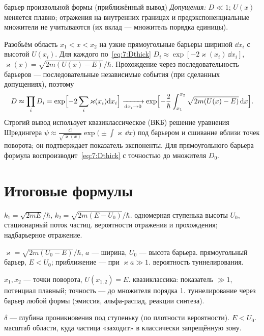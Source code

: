 \begin{derivation}[label=der:7:wkb]{барьер произвольной формы (приближённый вывод)}
\emph{Допущения:} $D\ll1$; $U(x)$ меняется плавно; отражения на внутренних границах и
предэкспоненциальные множители не учитываются (их вклад — множитель порядка единицы).

Разобьём область $x_1<x<x_2$ на узкие прямоугольные барьеры шириной $\dd x_i$ с высотой
$U(x_i)$. Для каждого по~\eqref{eq:7:Dthick} $D_i\approx\exp[-2\varkappa(x_i)\,\dd x_i]$,
$\varkappa(x)=\sqrt{2m(U(x)-E)}/\hbar$. Прохождение через последовательность барьеров — последовательные
независимые события (при сделанных допущениях), поэтому
\[
  D\approx\prod_iD_i=\exp\Bigl[-2\sum_i\varkappa(x_i)\mathrm{d} x_i\Bigr]\xrightarrow[\mathrm{d} x_i\to0]{}
  \exp\Bigl[-\frac2\hbar\int_{x_1}^{x_2}\sqrt{2m(U(x)-E)}\,\mathrm{d} x\Bigr].
\]
Строгий вывод использует квазиклассическое (ВКБ) решение уравнения Шредингера
$\psi\approx\frac{C}{\sqrt{\varkappa(x)}}\exp\bigl(\pm\int\varkappa\,\dd x\bigr)$ под барьером и сшивание вблизи
точек поворота; он подтверждает показатель экспоненты. Для прямоугольного барьера формула
воспроизводит~\eqref{eq:7:Dthick} с точностью до множителя $D_0$.
\end{derivation}

\section{Итоговые формулы}

 {$k_1=\sqrt{2mE}/\hbar$, $k_2=\sqrt{2m(E-U_0)}/\hbar$.}
 {одномерная ступенька высоты $U_0$, стационарный поток частиц.}
 {вероятности отражения и прохождения; надбарьерное отражение.}

 {$\varkappa=\sqrt{2m(U_0-E)}/\hbar$, $a$ — ширина, $U_0$ — высота барьера.}
 {прямоугольный барьер, $E<U_0$; приближение — при $\varkappa a\gg1$.}
 {вероятность туннелирования.}

 {$x_1,x_2$ — точки поворота, $U(x_{1,2})=E$.}
 {квазиклассика: показатель $\gg1$, потенциал плавный; точность — до множителя порядка 1.}
 {туннелирование через барьер любой формы (эмиссия, альфа-распад, реакции синтеза).}

 {$\delta$ — глубина проникновения под ступеньку (по плотности вероятности).}
 {$E<U_0$.}
 {масштаб области, куда частица «заходит» в классически запрещённую зону.}

